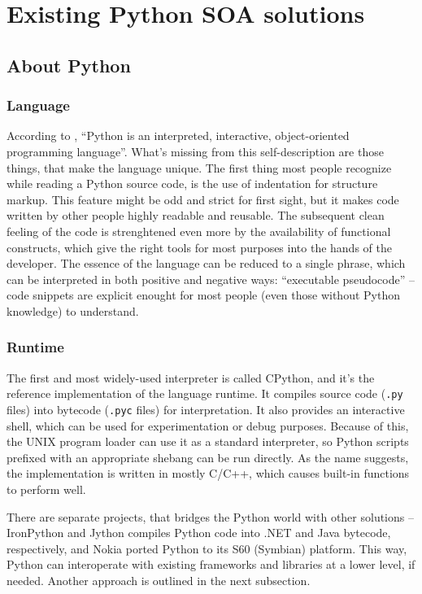 \chapter{Existing Python SOA solutions}

\section{About Python}

\subsection{Language}

According to \cite{python-faq}, ``Python is an interpreted, interactive, object-oriented programming language''. What's missing from this self-description are those things, that make the language unique. The first thing most people recognize while reading a Python source code, is the use of indentation for structure markup. This feature might be odd and strict for first sight, but it makes code written by other people highly readable and reusable. The subsequent clean feeling of the code is strenghtened even more by the availability of functional constructs, which give the right tools for most purposes into the hands of the developer. The essence of the language can be reduced to a single phrase, which can be interpreted in both positive and negative ways: ``executable pseudocode'' -- code snippets are explicit enought for most people (even those without Python knowledge) to understand.

\subsection{Runtime}

The first and most widely-used interpreter is called CPython, and it's the reference implementation of the language runtime. It compiles source code (\verb|.py| files) into bytecode (\verb|.pyc| files) for interpretation. It also provides an interactive shell, which can be used for experimentation or debug purposes. Because of this, the UNIX program loader can use it as a standard interpreter, so Python scripts prefixed with an appropriate shebang can be run directly. As the name suggests, the implementation is written in mostly C/C++, which causes built-in functions to perform well.

There are separate projects, that bridges the Python world with other solutions -- IronPython and Jython compiles Python code into .NET and Java bytecode, respectively, and Nokia ported Python to its S60 (Symbian) platform. This way, Python can interoperate with existing frameworks and libraries at a lower level, if needed. Another approach is outlined in the next subsection.

